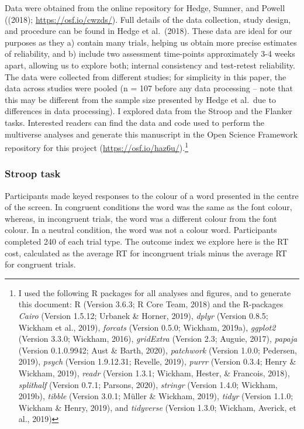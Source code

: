\documentclass[
  english,
  man,floatsintext]{apa6}
\begin{document}
Data were obtained from the online repository for Hedge, Sumner, and Powell ((2018); \url{https://osf.io/cwzds/}). Full details of the data collection, study design, and procedure can be found in Hedge et al.~(2018). These data are ideal for our purposes as they a) contain many trials, helping us obtain more precise estimates of reliability, and b) include two assessment time-points approximately 3-4 weeks apart, allowing us to explore both; internal consistency and test-retest reliability. The data were collected from different studies; for simplicity in this paper, the data across studies were pooled (n = 107 before any data processing -- note that this may be different from the sample size presented by Hedge et al.~due to differences in data processing). I explored data from the Stroop and the Flanker tasks. Interested readers can find the data and code used to perform the multiverse analyses and generate this manuscript in the Open Science Framework repository for this project (\url{https://osf.io/haz6u/}).\footnote{I used the following R packages for all analyses and figures, and to generate this document: R (Version 3.6.3; R Core Team, 2018) and the R-packages \emph{Cairo} (Version 1.5.12; Urbanek \& Horner, 2019), \emph{dplyr} (Version 0.8.5; Wickham et al., 2019), \emph{forcats} (Version 0.5.0; Wickham, 2019a), \emph{ggplot2} (Version 3.3.0; Wickham, 2016), \emph{gridExtra} (Version 2.3; Auguie, 2017), \emph{papaja} (Version 0.1.0.9942; Aust \& Barth, 2020), \emph{patchwork} (Version 1.0.0; Pedersen, 2019), \emph{psych} (Version 1.9.12.31; Revelle, 2019), \emph{purrr} (Version 0.3.4; Henry \& Wickham, 2019), \emph{readr} (Version 1.3.1; Wickham, Hester, \& Francois, 2018), \emph{splithalf} (Version 0.7.1; Parsons, 2020), \emph{stringr} (Version 1.4.0; Wickham, 2019b), \emph{tibble} (Version 3.0.1; Müller \& Wickham, 2019), \emph{tidyr} (Version 1.1.0; Wickham \& Henry, 2019), and \emph{tidyverse} (Version 1.3.0; Wickham, Averick, et al., 2019)}

\hypertarget{stroop-task}{%
\subsubsection{Stroop task}\label{stroop-task}}

Participants made keyed responses to the colour of a word presented in the centre of the screen. In congruent conditions the word was the same as the font colour, whereas, in incongruent trials, the word was a different colour from the font colour. In a neutral condition, the word was not a colour word. Participants completed 240 of each trial type. The outcome index we explore here is the RT cost, calculated as the average RT for incongruent trials minus the average RT for congruent trials.
\end{document}
